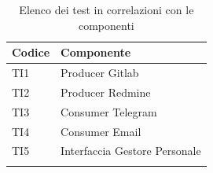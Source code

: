 	\begin{table}[H]
		\centering
		{\def\arraystretch{1.4}
		\begin{tabularx}{\textwidth}{YY}
			\textbf{Codice} & \textbf{Componente} \\
			\toprule
			TI1 & Producer Gitlab \\
			TI2 & Producer Redmine \\
			TI3 & Consumer Telegram \\
			TI4 & Consumer Email \\
			TI5 & Interfaccia Gestore Personale \\
			\bottomrule\\
		\end{tabularx}}
		\caption{Elenco dei test in correlazioni con le componenti}
	\end{table}
